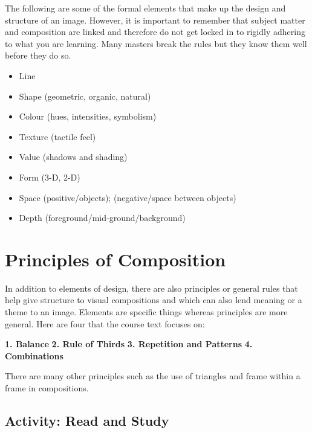 \documentclass[
  letterpaper,
  DIV=11,
  numbers=noendperiod]{scrreprt}
\providecommand{\tightlist}{%
  \setlength{\itemsep}{0pt}\setlength{\parskip}{0pt}}\usepackage{longtable,booktabs,array}
\begin{document}
The following are some of the formal elements that make up the design
and structure of an image. However, it is important to remember that
subject matter and composition are linked and therefore do not get
locked in to rigidly adhering to what you are learning. Many masters
break the rules but they know them well before they do so.

\begin{itemize}
\tightlist
\item
  Line
\item
  Shape (geometric, organic, natural)
\item
  Colour (hues, intensities, symbolism)
\item
  Texture (tactile feel)
\item
  Value (shadows and shading)
\item
  Form (3-D, 2-D)
\item
  Space (positive/objects); (negative/space between objects)
\item
  Depth (foreground/mid-ground/background)
\end{itemize}

\section{Principles of Composition}\label{principles-of-composition}

In addition to elements of design, there are also principles or general
rules that help give structure to visual compositions and which can also
lend meaning or a theme to an image. Elements are specific things
whereas principles are more general. Here are four that the course text
focuses on:

\textbf{1. Balance} \textbf{2. Rule of Thirds} \textbf{3. Repetition and
Patterns} \textbf{4. Combinations}

There are many other principles such as the use of triangles and frame
within a frame in compositions.

\subsection{Activity: Read and Study}\label{activity-read-and-study}
\end{document}
